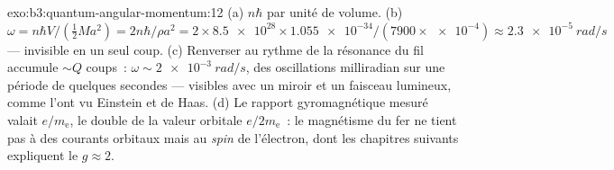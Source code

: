 \begin{solution}{exo:b3:quantum-angular-momentum:12}
(a) $n\hbar$ par unité de volume. (b) $\omega = n\hbar V/(\tfrac12 Ma^2)
= 2n\hbar/\rho a^2 = 2 \times \num{8.5e28} \times \num{1.055e-34}/
(7900 \times \num{e-4}) \approx \qty{2.3e-5}{rad/s}$ --- invisible en
un seul coup. (c) Renverser au rythme de la résonance du fil accumule
$\sim Q$ coups~: $\omega \sim \qty{2e-3}{rad/s}$, des oscillations
milliradian sur une période de quelques secondes --- visibles avec un
miroir et un faisceau lumineux, comme l'ont vu Einstein et de Haas.
(d) Le rapport gyromagnétique mesuré valait $e/m_{\text{e}}$, le
double de la valeur orbitale $e/2m_{\text{e}}$~: le magnétisme du fer
ne tient pas à des courants orbitaux mais au \emph{spin} de
l'électron, dont les chapitres suivants expliquent le $g \approx 2$.
\end{solution}

